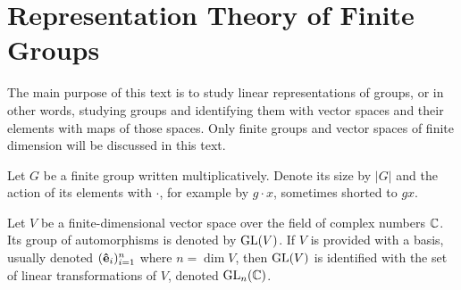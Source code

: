 \clearpage{\thispagestyle{empty}}
\section{Representation Theory of Finite Groups}



The main purpose of this text is to study linear representations of groups, or in other words, studying groups and identifying them with vector spaces and their elements with maps of those spaces. Only finite groups and vector spaces of finite dimension will be discussed in this text.

Let $G$ be a finite group written multiplicatively. Denote its size by $|G|$ and the action of its elements with $\cdot$, for example by $g \cdot x$, sometimes shorted to $gx$.

Let $V$ be a finite-dimensional vector space over the field of complex numbers $\mathbb{C}$. Its group of automorphisms is denoted by $\text{GL}(V)$. If $V$ is provided with a basis, usually denoted $(\mathbf{\hat{e}}_i)_{i=1}^n$ where $n = \dim V$, then $\text{GL}(V)$ is identified with the set of linear transformations of $V$, denoted $\text{GL}_n(\mathbb{C})$\cite[18.1]{DummitFoote}.


